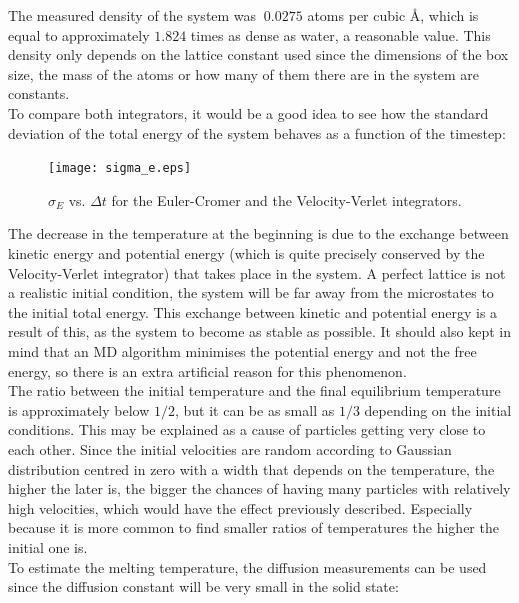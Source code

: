 \documentclass[11pt,a4paper,oneside]{article}
\begin{document}
		The measured density of the system was $~0.0275$ atoms per cubic \AA, which is equal to approximately $1.824$ times as dense as water, a reasonable value. This density only depends on the lattice constant used since the dimensions of the box size, the mass of the atoms or how many of them there are in the system are constants.\\
		
		To compare both integrators, it would be a good idea to see how the standard deviation of the total energy of the system behaves as a function of the timestep:\\
		
		\begin{figure}[ht!]\begin{center}\texttt{[image: sigma\_e.eps]}\par\protect\caption{\scriptsize $\sigma_E$ vs. $\Delta t$ for the Euler-Cromer and the Velocity-Verlet integrators.}\end{center}\end{figure}
		
		The decrease in the temperature at the beginning is due to the exchange between kinetic energy and potential energy (which is quite precisely conserved by the Velocity-Verlet integrator) that takes place in the system. A perfect lattice is not a realistic initial condition, the system will be far away from the microstates to the initial total energy. This exchange between kinetic and potential energy is a result of this, as the system to become as stable as possible. It should also kept in mind that an MD algorithm minimises the potential energy and not the free energy, so there is an extra artificial reason for this phenomenon.\\
		
		The ratio between the initial temperature and the final equilibrium temperature is approximately below $1/2$, but it can be as small as $1/3$ depending on the initial conditions. This may be explained as a cause of particles getting very close to each other. Since the initial velocities are random according to Gaussian distribution centred in zero with a width that depends on the temperature, the higher the later is, the bigger the chances of having many particles with relatively high velocities, which would have the effect previously described. Especially because it is more common to find smaller ratios of temperatures the higher the initial one is.\\
		
		To estimate the melting temperature, the diffusion measurements can be used since the diffusion constant will be very small in the solid state:\newpage
		
\end{document}
